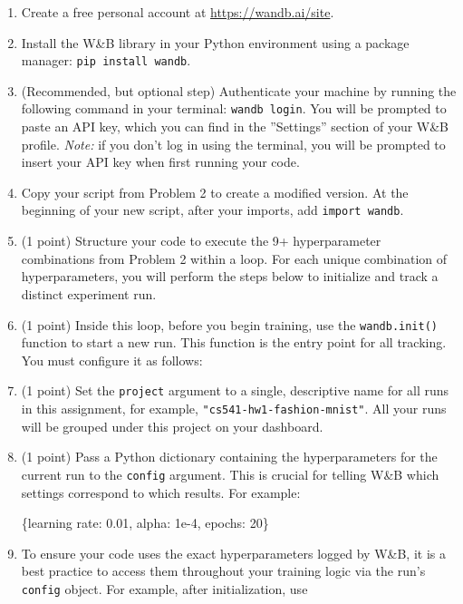 \documentclass[
  letterpaper,
  DIV=11,
  numbers=noendperiod]{scrartcl}
\newenvironment{Shaded}{\begin{snugshade}}{\end{snugshade}}
\newcommand{\DecValTok}[1]{\textcolor[rgb]{0.68,0.00,0.00}{#1}}
\newcommand{\FloatTok}[1]{\textcolor[rgb]{0.68,0.00,0.00}{#1}}
\newcommand{\NormalTok}[1]{\textcolor[rgb]{0.00,0.23,0.31}{#1}}
\newcommand{\StringTok}[1]{\textcolor[rgb]{0.13,0.47,0.30}{#1}}
\begin{document}
\begin{enumerate}
\def\labelenumi{\arabic{enumi}.}
\item
  Create a free personal account at \url{https://wandb.ai/site}.
\item
  Install the W\&B library in your Python environment using a package
  manager: \texttt{pip\ install\ wandb}.
\item
  (Recommended, but optional step) Authenticate your machine by running
  the following command in your terminal: \texttt{wandb\ login}. You
  will be prompted to paste an API key, which you can find in the
  ''Settings'' section of your W\&B profile. \emph{Note:} if you don't
  log in using the terminal, you will be prompted to insert your API key
  when first running your code.
\item
  Copy your script from Problem 2 to create a modified version. At the
  beginning of your new script, after your imports, add
  \texttt{import\ wandb}.
\item
  (1 point) Structure your code to execute the 9+ hyperparameter
  combinations from Problem 2 within a loop. For each unique combination
  of hyperparameters, you will perform the steps below to initialize and
  track a distinct experiment run.
\item
  (1 point) Inside this loop, before you begin training, use the
  \texttt{wandb.init()} function to start a new run. This function is
  the entry point for all tracking. You must configure it as follows:
\item
  (1 point) Set the \texttt{project} argument to a single, descriptive
  name for all runs in this assignment, for example,
  \texttt{"cs541-hw1-fashion-mnist"}. All your runs will be grouped
  under this project on your dashboard.
\item
  (1 point) Pass a Python dictionary containing the hyperparameters for
  the current run to the \texttt{config} argument. This is crucial for
  telling W\&B which settings correspond to which results. For example:

\begin{Shaded}
\begin{Highlighting}[]
\NormalTok{\{}\StringTok{\textquotesingle{}learning rate\textquotesingle{}}\NormalTok{: }\FloatTok{0.01}\NormalTok{, }\StringTok{\textquotesingle{}alpha\textquotesingle{}}\NormalTok{: }\FloatTok{1e{-}4}\NormalTok{, }\StringTok{\textquotesingle{}epochs\textquotesingle{}}\NormalTok{: }\DecValTok{20}\NormalTok{\}}
\end{Highlighting}
\end{Shaded}
\item
  To ensure your code uses the exact hyperparameters logged by W\&B, it
  is a best practice to access them throughout your training logic via
  the run's \texttt{config} object. For example, after initialization,
  use


\end{enumerate}
\end{document}

